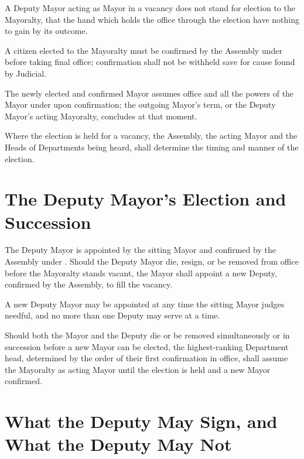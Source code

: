 \begin{clauses}
\item A Deputy Mayor acting as Mayor in a vacancy does not stand for election to the Mayoralty, that the hand which holds the office through the election have nothing to gain by its outcome.
\item A citizen elected to the Mayoralty must be confirmed by the Assembly under  before taking final office; confirmation shall not be withheld save for cause found by Judicial.
\item The newly elected and confirmed Mayor assumes office and all the powers of the Mayor under  upon confirmation; the outgoing Mayor's term, or the Deputy Mayor's acting Mayoralty, concludes at that moment.
\item Where the election is held for a vacancy, the Assembly, the acting Mayor and the Heads of Departments being heard, shall determine the timing and manner of the election.
\end{clauses}

\section{The Deputy Mayor's Election and Succession}
\label{sec:succession:deputy-mayors-election-and-succession}

The Deputy Mayor is appointed by the sitting Mayor and confirmed by the Assembly under . Should the Deputy Mayor die, resign, or be removed from office before the Mayoralty stands vacant, the Mayor shall appoint a new Deputy, confirmed by the Assembly, to fill the vacancy.

\begin{clauses}
\item A new Deputy Mayor may be appointed at any time the sitting Mayor judges needful, and no more than one Deputy may serve at a time.
\item Should both the Mayor and the Deputy die or be removed simultaneously or in succession before a new Mayor can be elected, the highest-ranking Department head, determined by the order of their first confirmation in office, shall assume the Mayoralty as acting Mayor until the election is held and a new Mayor confirmed.
\end{clauses}

\section{What the Deputy May Sign, and What the Deputy May Not}
\label{sec:succession:what-the-deputy-may-sign}

